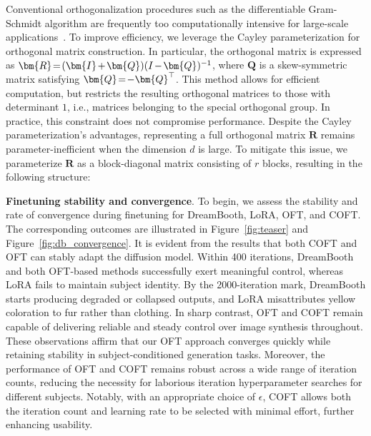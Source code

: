 \begin{itemize}[leftmargin=*,nosep]
Conventional orthogonalization procedures such as the differentiable Gram-Schmidt algorithm are frequently too computationally intensive for large-scale applications~\cite{liu2021orthogonal}. To improve efficiency, we leverage the Cayley parameterization for orthogonal matrix construction. In particular, the orthogonal matrix is expressed as $\thickmuskip=2mu \medmuskip=2mu \bm{R}=(\bm{I}+\bm{Q})(I-\bm{Q})^{-1}$, where $\bm{Q}$ is a skew-symmetric matrix satisfying $\thickmuskip=2mu \medmuskip=2mu \bm{Q}=-\bm{Q}^\top$. This method allows for efficient computation, but restricts the resulting orthogonal matrices to those with determinant $1$, i.e., matrices belonging to the special orthogonal group. In practice, this constraint does not compromise performance. Despite the Cayley parameterization’s advantages, representing a full orthogonal matrix $\bm{R}$ remains parameter-inefficient when the dimension $d$ is large. To mitigate this issue, we parameterize $\bm{R}$ as a block-diagonal matrix consisting of $r$ blocks, resulting in the following structure:

\textbf{Finetuning stability and convergence}. To begin, we assess the stability and rate of convergence during finetuning for DreamBooth, LoRA, OFT, and COFT. The corresponding outcomes are illustrated in Figure~\ref{fig:teaser} and Figure~\ref{fig:db_convergence}. It is evident from the results that both COFT and OFT can stably adapt the diffusion model. Within 400 iterations, DreamBooth and both OFT-based methods successfully exert meaningful control, whereas LoRA fails to maintain subject identity. By the 2000-iteration mark, DreamBooth starts producing degraded or collapsed outputs, and LoRA misattributes yellow coloration to fur rather than clothing. In sharp contrast, OFT and COFT remain capable of delivering reliable and steady control over image synthesis throughout. These observations affirm that our OFT approach converges quickly while retaining stability in subject-conditioned generation tasks. Moreover, the performance of OFT and COFT remains robust across a wide range of iteration counts, reducing the necessity for laborious iteration hyperparameter searches for different subjects. Notably, with an appropriate choice of $\epsilon$, COFT allows both the iteration count and learning rate to be selected with minimal effort, further enhancing usability.


\end{itemize}
